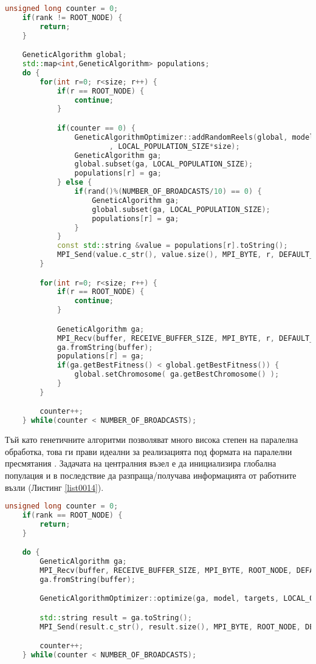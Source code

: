 \begin{lstlisting}[caption=Алгоритъм на централния възел, language=C++, basicstyle=\tiny, label=list0014]
	unsigned long counter = 0;
	if(rank != ROOT_NODE) {
		return;
	}

	GeneticAlgorithm global;
	std::map<int,GeneticAlgorithm> populations;
	do {
		for(int r=0; r<size; r++) {
			if(r == ROOT_NODE) {
				continue;
			}

			if(counter == 0) {
				GeneticAlgorithmOptimizer::addRandomReels(global, model, targets
						, LOCAL_POPULATION_SIZE*size);
				GeneticAlgorithm ga;
				global.subset(ga, LOCAL_POPULATION_SIZE);
				populations[r] = ga;
			} else {
				if(rand()%(NUMBER_OF_BROADCASTS/10) == 0) {
					GeneticAlgorithm ga;
					global.subset(ga, LOCAL_POPULATION_SIZE);
					populations[r] = ga;
				}
			}
			const std::string &value = populations[r].toString();
			MPI_Send(value.c_str(), value.size(), MPI_BYTE, r, DEFAULT_TAG, MPI_COMM_WORLD);
		}

		for(int r=0; r<size; r++) {
			if(r == ROOT_NODE) {
				continue;
			}

			GeneticAlgorithm ga;
			MPI_Recv(buffer, RECEIVE_BUFFER_SIZE, MPI_BYTE, r, DEFAULT_TAG, MPI_COMM_WORLD, MPI_STATUS_IGNORE);
			ga.fromString(buffer);
			populations[r] = ga;
			if(ga.getBestFitness() < global.getBestFitness()) {
				global.setChromosome( ga.getBestChromosome() );
			}
		}

		counter++;
	} while(counter < NUMBER_OF_BROADCASTS);
\end{lstlisting}

Тъй като генетичните алгоритми позволяват много висока степен на паралелна обработка, това ги прави идеални за реализацията под формата на паралелни пресмятания \cite{Balabanov-02}. Задачата на централния възел е да инициализира глобална популация и в последствие да разпраща/получава информацията от работните възли (Листинг \ref{list0014}). 

\begin{lstlisting}[caption=Алгоритъм на работните възли, language=C++, basicstyle=\tiny, label=list0015]
	unsigned long counter = 0;
	if(rank == ROOT_NODE) {
		return;
	}

	do {
		GeneticAlgorithm ga;
		MPI_Recv(buffer, RECEIVE_BUFFER_SIZE, MPI_BYTE, ROOT_NODE, DEFAULT_TAG, MPI_COMM_WORLD, MPI_STATUS_IGNORE);
		ga.fromString(buffer);

		GeneticAlgorithmOptimizer::optimize(ga, model, targets, LOCAL_OPTIMIZATION_EPOCHES);

		std::string result = ga.toString();
		MPI_Send(result.c_str(), result.size(), MPI_BYTE, ROOT_NODE, DEFAULT_TAG, MPI_COMM_WORLD);

		counter++;
	} while(counter < NUMBER_OF_BROADCASTS);
\end{lstlisting}

